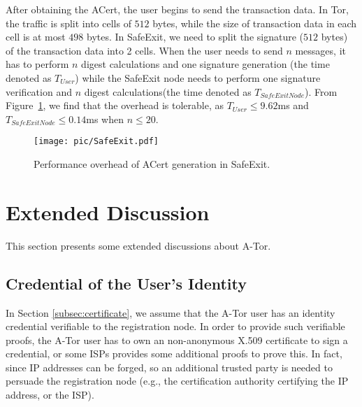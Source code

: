 After obtaining the ACert, the user begins to send the transaction data.
In Tor, the traffic is split  into cells of $512$ bytes, while the size of transaction data in each cell is at most $498$ bytes.
In SafeExit, we need to split the signature ($512$ bytes) of the transaction data into 2 cells.
When the user needs to send $n$ messages,
it has to perform $n$ digest calculations and one signature generation (the time denoted as $T_{User}$)  while the SafeExit node needs to perform one signature verification and $n$ digest calculations(the time denoted as $T_{SafeExitNode}$).
From Figure~\ref{pic:comm}, we find that the overhead is tolerable, as $T_{User} \leq 9.62$ms and $T_{SafeExitNode} \leq 0.14$ms when $n \leq 20$.





\begin{figure}[bt]
\centering
  \texttt{[image: pic/SafeExit.pdf]}
 \caption{Performance overhead of ACert generation in SafeExit.}\label{pic:comm}
\end{figure}


\section{Extended Discussion}
\label{sec:extended-discussion}
This section presents some extended discussions about A-Tor.

\subsection{Credential of the User's Identity}
In Section \ref{subsec:certificate},
  we assume that the A-Tor user has an identity credential verifiable to the registration node.
In order to provide such verifiable proofs,
 the A-Tor user has to own an non-anonymous X.509 certificate to sign a credential,
    or some ISPs provides some additional proofs to prove this.
In fact, since IP addresses can be forged, so an additional trusted party is needed to persuade the registration node
    (e.g., the certification authority certifying the IP address, or the ISP).



